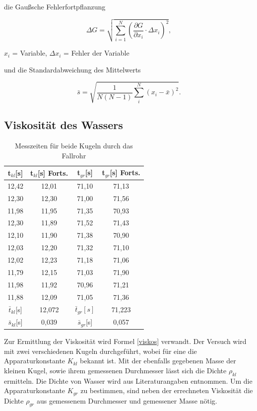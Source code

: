 die Gaußsche Fehlerfortpflanzung

\begin{formel}
\begin{equation}
\Delta G = \sqrt{\sum_{i=1}^{N}\left( \frac{\partial G}{\partial x_i}\cdot \Delta x_i\right)^2},
\label{gauss}
\end{equation}
\caption*{$x_i$ = Variable, $\Delta x_i$ = Fehler der Variable}
\end{formel}

und die Standardabweichung des Mittelwerts

\begin{equation}
 \bar s = \sqrt{\frac{1}{N(N-1)} \sum_{i}^{N} (x_i - \bar{x})^2}.
\end{equation}

\subsection{Viskosität des Wassers}

\renewcommand{\arraystretch}{1.2}
\begin{table}[h]
 \begin{tabular}{c|c||c|c}
 t$_{kl}$[s] & t$_{kl}$[s] Forts. & t$_{gr}$[s] & t$_{gr}$[s] Forts.\\
 \hline
12,42&	12,01&	71,10&	71,13\\
12,30&	12,30&	71,00&	71,56\\
11,98&	11,95&	71,35&	70,93\\
12,30&	11,89&	71,52&	71,43\\
12,10&	11,90&	71,38&	70,90\\
12,03&	12,20&	71,32&	71,10\\
12,02&	12,23&	71,18&	71,06\\
11,79&	12,15&	71,03&	71,90\\
11,98&	11,92&	70,96&	71,21\\
11,88&	12,09&	71,05&	71,36\\
\hline
$\bar t_{kl}$[s] &12,072 &$\bar t_{gr}[s] $&71,223\\
$\bar s_{kl}$[s] & 0,039 & $\bar s_{gr}$[s] & 0,057
 \end{tabular}
\caption{Messzeiten für beide Kugeln durch das Fallrohr}
\label{tabviskos}
\end{table}
\renewcommand{\arraystretch}{1}

Zur Ermittlung der Viskosität wird Formel \eqref{viskos} verwandt. Der Versuch wird mit zwei verschiedenen Kugeln durchgeführt, wobei
für eine die Apparaturkonstante $K_{kl}$ bekannt ist. Mit der ebenfalls gegebenen Masse der kleinen Kugel, sowie ihrem gemessenen Durchmesser
lässt sich die Dichte $\rho_{kl}$ ermitteln. Die Dichte von Wasser wird aus Literaturangaben entnommen. Um die Apparaturkonstante 
$K_{gr}$ zu bestimmen, sind neben der errechneten Viskosität die Dichte $\rho_{gr}$ aus gemessenem Durchmesser und gemessener Masse nötig.


